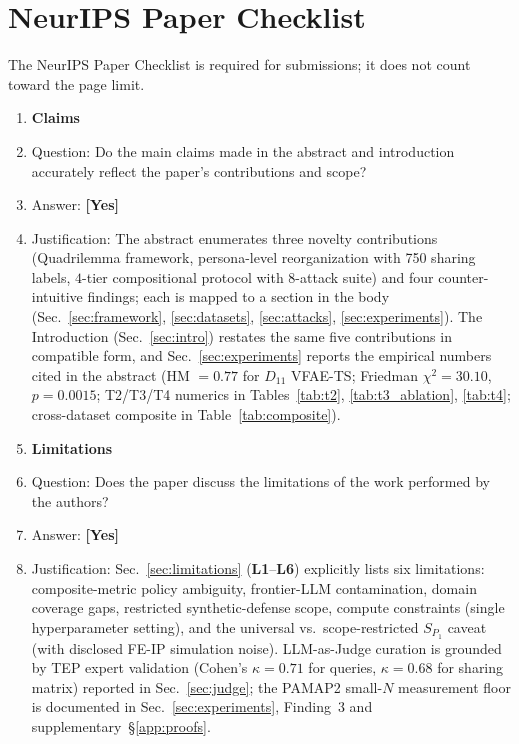 \documentclass{article}
\theoremstyle{remark}
\begin{document}
\section*{NeurIPS Paper Checklist}

The NeurIPS Paper Checklist is required for submissions; it does not count toward the page limit.

\begin{enumerate}

\item {\bf Claims}
\item[] Question: Do the main claims made in the abstract and introduction accurately reflect the paper's contributions and scope?
\item[] Answer: \textbf{[Yes]}
\item[] Justification: The abstract enumerates three novelty contributions (Quadrilemma framework, persona-level reorganization with 750 sharing labels, $4$-tier compositional protocol with 8-attack suite) and four counter-intuitive findings; each is mapped to a section in the body (Sec.~\ref{sec:framework}, \ref{sec:datasets}, \ref{sec:attacks}, \ref{sec:experiments}). The Introduction (Sec.~\ref{sec:intro}) restates the same five contributions in compatible form, and Sec.~\ref{sec:experiments} reports the empirical numbers cited in the abstract (HM $= 0.77$ for $D_{11}$ VFAE-TS; Friedman $\chi^2 = 30.10$, $p = 0.0015$; T2/T3/T4 numerics in Tables~\ref{tab:t2}, \ref{tab:t3_ablation}, \ref{tab:t4}; cross-dataset composite in Table~\ref{tab:composite}).

\item {\bf Limitations}
\item[] Question: Does the paper discuss the limitations of the work performed by the authors?
\item[] Answer: \textbf{[Yes]}
\item[] Justification: Sec.~\ref{sec:limitations} (\textbf{L1}--\textbf{L6}) explicitly lists six limitations: composite-metric policy ambiguity, frontier-LLM contamination, domain coverage gaps, restricted synthetic-defense scope, compute constraints (single hyperparameter setting), and the universal vs.\ scope-restricted $S_{P_1}$ caveat (with disclosed FE-IP simulation noise). LLM-as-Judge curation is grounded by TEP expert validation (Cohen's $\kappa = 0.71$ for queries, $\kappa = 0.68$ for sharing matrix) reported in Sec.~\ref{sec:judge}; the PAMAP2 small-$N$ measurement floor is documented in Sec.~\ref{sec:experiments}, Finding~3 and supplementary~\S\ref{app:proofs}.


\end{enumerate}
\end{document}
